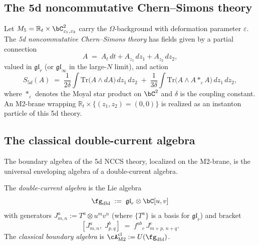 \subsection{The 5d noncommutative Chern--Simons theory}

\begin{definition}
\label{def:5d-nccs}
Let $M_5 = \mathbb{R}_t \times \bC^2_{z_1,z_2}$ carry the
$\Omega$-background with deformation parameter $\varepsilon$.
The \emph{5d noncommutative Chern--Simons theory} has fields given by a
partial connection
\[
 A \;=\; A_t\,dt + A_{z_1}\,dz_1 + A_{z_2}\,dz_2,
\]
valued in $\mathfrak{gl}_r$ (or $\mathfrak{gl}_\infty$ in the large-$N$
limit), and action
\begin{equation}\label{eq:5d-nccs-action}
 S_{5d}(A)
 \;=\;
 \frac{1}{2\delta}\int \mathrm{Tr}\bigl(A \wedge dA\bigr)\,dz_1\,dz_2
 \;+\;
 \frac{1}{3\delta}\int \mathrm{Tr}\bigl(A \wedge A *_\varepsilon A\bigr)\,dz_1\,dz_2,
\end{equation}
where $*_\varepsilon$ denotes the Moyal star product on $\bC^2$
and $\delta$ is the coupling constant. An M2-brane wrapping
$\mathbb{R}_t \times \{(z_1,z_2) = (0,0)\}$ is realized as an
instanton particle of this 5d theory.
\end{definition}

\subsection{The classical double-current algebra}

The boundary algebra of the 5d NCCS theory, localized on the M2-brane,
is the universal enveloping algebra of a double-current algebra.

\begin{definition}
\label{def:double-current-algebra}
The \emph{double-current algebra} is the Lie algebra
\begin{equation}\label{eq:g-dbl}
 \fg_{\mathrm{dbl}}
 \;:=\;
 \mathfrak{gl}_r \otimes \bC[u,v]
\end{equation}
with generators $J^a_{m,n} := T^a \otimes u^m v^n$
(where $\{T^a\}$ is a basis for $\mathfrak{gl}_r$)
and bracket
\begin{equation}\label{eq:g-dbl-bracket}
 [J^a_{m,n},\; J^b_{p,q}]
 \;=\;
 f^{ab}{}_c\, J^c_{m+p,\,n+q}.
\end{equation}
The \emph{classical boundary algebra} is
$\cA^{\mathrm{cl}}_{\mathrm{M2}} := U(\fg_{\mathrm{dbl}})$.
\end{definition}

